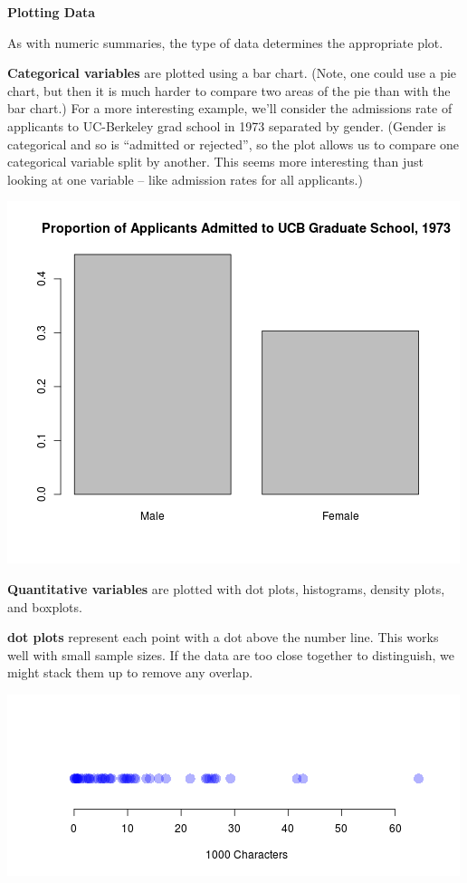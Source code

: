 \begin{center}
{\bf {\large  Plotting Data}}
\end{center}

 As with numeric summaries, the type of data determines the
 appropriate plot. \vspace{-.5cm}
\begin{list}{}{}
\item [\bf Categorical variables] are plotted using a bar
  chart. (Note, one could use a pie chart, but then it is much harder
  to compare two areas of the pie than with the bar chart.)
  For a more interesting example, we'll consider the admissions rate
  of applicants  to UC-Berkeley grad school in 1973 separated by
  gender. (Gender is categorical and so is ``admitted or  rejected'',
  so the plot allows us to compare one categorical variable split by
  another. This seems more interesting than just looking at one
  variable -- like admission rates for all applicants.)

  \begin{center}
  \includegraphics[width = .45\linewidth]{../plots/UCBadmissions.png}
  \end{center}
  
\item [\bf Quantitative variables] are plotted with dot plots, histograms,
  density plots, and boxplots.

  \begin{list}{}{}
  \item [\bf dot plots] represent each point with a dot above the number
    line. This works well with small sample sizes.  If the data are
    too close together to distinguish, we might stack them up to
    remove any overlap. \vspace{-1cm}

  \begin{center}
  \includegraphics[width = .8\linewidth]{../plots/dotplotDemo1.png}
  \end{center}


\end{list}
\end{list}
